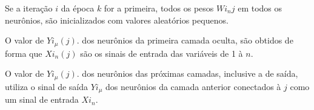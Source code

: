 \documentclass[	12pt, Times, openright, twoside, a4paper, english, brazil]{abntex2}
\begin{document}
            Se a iteração $i$ da época $k$ for a primeira, todos os pesos $Wi_{n}j$ em todos os neurônios, são inicializados com valores aleatórios pequenos.\\ 
            
            
            \begin{figure}[H]
           \end{figure}
           
           \begin{figure}[H]
           \end{figure}
            
            O valor de $Yi_{\mu}(j)$. dos neurônios da primeira camada oculta, são obtidos de forma que $Xi_{n}(j)$ são os sinais de entrada das variáveis de 1 à $n$.
            
            O valor de $Yi_{\mu}(j)$. dos neurônios das próximas camadas, inclusive a de saída, utiliza o sinal de saída $Yi_{\mu}$ dos neurônios da camada anterior conectados à $j$ como um sinal de entrada $Xi_{n}$.
            
\end{document}
